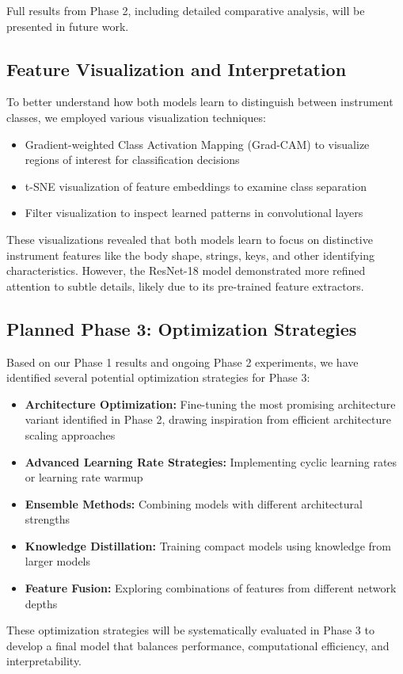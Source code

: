 Full results from Phase 2, including detailed comparative analysis, will be presented in future work.

\subsection{Feature Visualization and Interpretation}
To better understand how both models learn to distinguish between instrument classes, we employed various visualization techniques:
\begin{itemize}
    \item Gradient-weighted Class Activation Mapping (Grad-CAM) to visualize regions of interest for classification decisions
    \item t-SNE visualization of feature embeddings to examine class separation
    \item Filter visualization to inspect learned patterns in convolutional layers
\end{itemize}


These visualizations revealed that both models learn to focus on distinctive instrument features like the body shape, strings, keys, and other identifying characteristics. However, the ResNet-18 model demonstrated more refined attention to subtle details, likely due to its pre-trained feature extractors.

\subsection{Planned Phase 3: Optimization Strategies}
Based on our Phase 1 results and ongoing Phase 2 experiments, we have identified several potential optimization strategies for Phase 3:
\begin{itemize}
    \item \textbf{Architecture Optimization:} Fine-tuning the most promising architecture variant identified in Phase 2, drawing inspiration from efficient architecture scaling approaches \cite{tan2019efficientnet}
    \item \textbf{Advanced Learning Rate Strategies:} Implementing cyclic learning rates or learning rate warmup
    \item \textbf{Ensemble Methods:} Combining models with different architectural strengths
    \item \textbf{Knowledge Distillation:} Training compact models using knowledge from larger models
    \item \textbf{Feature Fusion:} Exploring combinations of features from different network depths
\end{itemize}

These optimization strategies will be systematically evaluated in Phase 3 to develop a final model that balances performance, computational efficiency, and interpretability.
